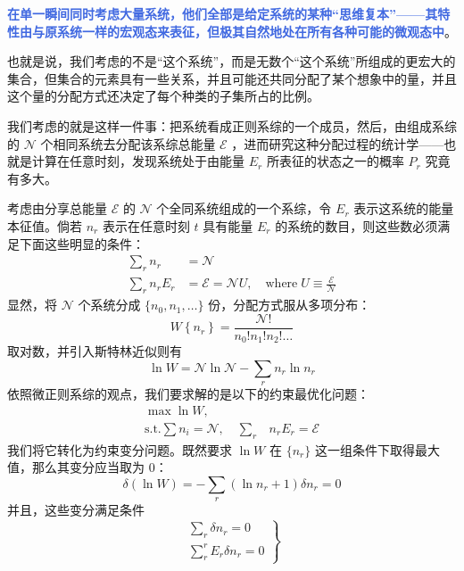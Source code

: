 \textcolor{RoyalBlue}{\textbf{\kaishu 在单一瞬间同时考虑大量系统，他们全部是给定系统的某种“思维复本”——其特性由与原系统一样的宏观态来表征，但极其自然地处在所有各种可能的微观态中}}。

也就是说，我们考虑的不是“这个系统”，而是无数个“这个系统”所组成的更宏大的集合，但集合的元素具有一些关系，并且可能还共同分配了某个想象中的量，并且这个量的分配方式还决定了每个种类的子集所占的比例。

我们考虑的就是这样一件事：把系统看成正则系综的一个成员，然后，由组成系综的 $\mathcal{N}$ 个相同系统去分配该系综总能量 $\mathcal{E}$ ，进而研究这种分配过程的统计学——也就是计算在任意时刻，发现系统处于由能量 $E_r$ 所表征的状态之一的概率 $P_r$ 究竟有多大。

考虑由分享总能量 $\mathcal{E}$ 的 $\mathcal{N}$ 个全同系统组成的一个系综，令 $E_r$ 表示这系统的能量本征值。倘若 $n_r$ 表示在任意时刻 $t$ 具有能量 $E_r$ 的系统的数目，则这些数必须满足下面这些明显的条件：
\begin{align}
    \sum_r n_r&=\mathcal{N} \\
    \sum_r n_r E_r&=\mathcal{E}=\mathcal{N} U, \quad\text{where}\; U \equiv \frac{\mathcal{E}}{\mathcal{N}}  
\end{align}
显然，将 $\mathcal{N}$ 个系统分成 $\{n_0,n_1,\dots\}$ 份，分配方式服从多项分布：
\begin{equation}
    W\left\{n_r\right\}=\frac{\mathcal{N} !}{n_{0} ! n_{1} ! n_{2} ! \ldots}
\end{equation}
取对数，并引入斯特林近似则有
\begin{equation}
    \ln W=\mathcal{N} \ln \mathcal{N}-\sum_r n_r \ln n_r
\end{equation}
依照微正则系综的观点，我们要求解的是以下的约束最优化问题：
\begin{equation}\label{equ:optimizeIII}
    \begin{split}
        \max \ln W,&\\
        \text{s.t.}\sum n_i = \mathcal{N},\quad\sum_r &n_r E_r=\mathcal{E}
    \end{split}
\end{equation}
我们将它转化为约束变分问题。既然要求 $\ln W$ 在 $\{n_r\}$ 这一组条件下取得最大值，那么其变分应当取为 $0$：
\[
    \delta(\ln W)=-\sum_r\left(\ln n_r+1\right) \delta n_r = 0
\]
并且，这些变分满足条件
\[
    \left.\begin{array}{l}
        \sum_r \delta n_r=0 \\
        \sum_r^r E_r \delta n_r=0
        \end{array}\right\}
\]
